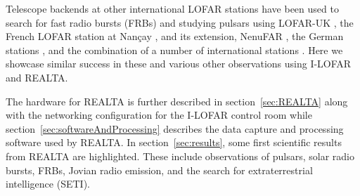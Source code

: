 Telescope backends at other international LOFAR stations have been used to search for fast radio bursts (FRBs) and studying pulsars using LOFAR-UK \citep[for example,][]{Karastergiou2015}, the French LOFAR station at Nançay \citep[for example,][]{Rajwade2016,Bondonneau2017}, and its extension, NenuFAR \citep[for example,][]{Bondonneau2020}, the German stations \citep[e.g][]{Donner2019, Porayko2019, Tiburzi2019}, and the combination of a number of international stations \citep[for example,][]{Mereghetti2016, Hermsen2018, Michilli2018}. Here we showcase similar success in these and various other observations using I-LOFAR and REALTA. 


The hardware for REALTA is further described in section~\ref{sec:REALTA} along with the networking configuration for the I-LOFAR control room while section~\ref{sec:softwareAndProcessing} describes the data capture and processing software used by REALTA. In section~\ref{sec:results}, some first scientific results from REALTA are highlighted. These include observations of pulsars, solar radio bursts, FRBs, Jovian radio emission, and the search for extraterrestrial intelligence (SETI).  %

